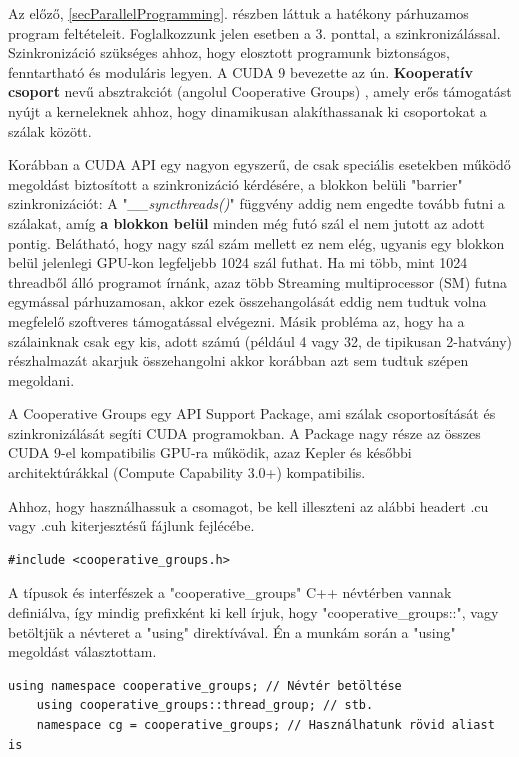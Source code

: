 Az előző, \ref{secParallelProgramming}. részben láttuk a hatékony párhuzamos program feltételeit. Foglalkozzunk jelen esetben a 3. ponttal, a szinkronizálással. Szinkronizáció szükséges ahhoz, hogy elosztott programunk biztonságos, fenntartható és moduláris legyen. A CUDA 9 bevezette az ún. \textbf{Kooperatív csoport} nevű absztrakciót (angolul Cooperative Groups) \cite{CUDAdoc_coopGroups}, amely erős támogatást nyújt a kerneleknek ahhoz, hogy dinamikusan alakíthassanak ki csoportokat a szálak között.

Korábban a CUDA API egy nagyon egyszerű, de csak speciális esetekben működő megoldást biztosított a szinkronizáció kérdésére, a blokkon belüli "barrier" szinkronizációt: A "\textit{\_\_syncthreads()}" függvény addig nem engedte tovább futni a szálakat, amíg \textbf{a blokkon belül} minden még futó szál el nem jutott az adott pontig. Belátható, hogy nagy szál szám mellett ez nem elég, ugyanis egy blokkon belül jelenlegi GPU-kon legfeljebb 1024 szál futhat. Ha mi több, mint 1024 threadből álló programot írnánk, azaz több Streaming multiprocessor (SM) futna egymással párhuzamosan, akkor ezek összehangolását eddig nem tudtuk volna megfelelő szoftveres támogatással elvégezni. Másik probléma az, hogy ha a szálainknak csak egy kis, adott számú (például 4 vagy 32, de tipikusan 2-hatvány) részhalmazát akarjuk összehangolni akkor korábban azt sem tudtuk szépen megoldani.

A Cooperative Groups egy API Support Package, ami szálak csoportosítását és szinkronizálását segíti CUDA programokban. A Package nagy része az összes CUDA 9-el kompatibilis GPU-ra működik, azaz Kepler és későbbi architektúrákkal (Compute Capability 3.0+) kompatibilis.

Ahhoz, hogy használhassuk a csomagot, be kell illeszteni az alábbi headert .cu vagy .cuh kiterjesztésű fájlunk fejlécébe.

\begin{lstlisting}[style=CStyle]
	#include <cooperative_groups.h>
\end{lstlisting}

A típusok és interfészek a "cooperative\_groups" C++ névtérben vannak definiálva, így mindig prefixként ki kell írjuk, hogy "cooperative\_groups::", vagy betöltjük a névteret a "using" direktívával. Én a munkám során a "using" megoldást választottam.

\begin{lstlisting}[style=CStyle]
	using namespace cooperative_groups; // Névtér betöltése
	using cooperative_groups::thread_group; // stb. 
	namespace cg = cooperative_groups; // Használhatunk rövid aliast is
\end{lstlisting}

